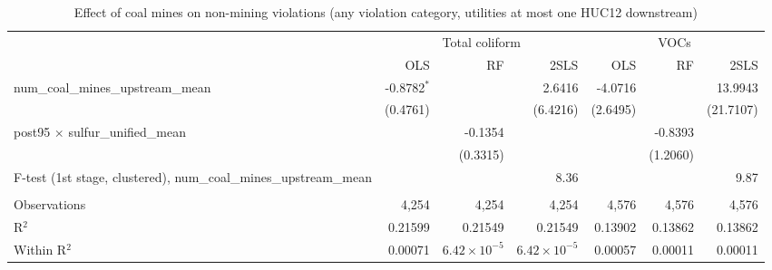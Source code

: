 
\begin{table}[htbp]
   
   \caption{\label{2sls_dwnstrm_nonminevio_allcat} Effect of coal mines on non-mining violations (any violation category, utilities at most one HUC12 downstream)}
   \bigskip
   
   \centering
   
   \begin{adjustbox}{width = \textwidth, center}
      
      
      \begin{tabular}{lrrrrrr}
         \toprule
         
          & \multicolumn{3}{c}{Total coliform} & \multicolumn{3}{c}{VOCs}\\
         
                                                                             & OLS           & RF                    & 2SLS                  & OLS      & RF       & 2SLS\\  
         
         \midrule 
         num\_coal\_mines\_upstream\_mean                                    & -0.8782$^{*}$ &                       & 2.6416                & -4.0716  &          & 13.9943\\   
                                                                             & (0.4761)      &                       & (6.4216)              & (2.6495) &          & (21.7107)\\   
         post95 $\times$ sulfur\_unified\_mean                               &               & -0.1354               &                       &          & -0.8393  &   \\   
                                                                             &               & (0.3315)              &                       &          & (1.2060) &   \\   
         
         F-test (1st stage, clustered), num\_coal\_mines\_upstream\_mean     &               &                       & 8.36                  &          &          & 9.87\\  
         
          \\
         
         Observations                                                        & 4,254         & 4,254                 & 4,254                 & 4,576    & 4,576    & 4,576\\  
         R$^2$                                                               & 0.21599       & 0.21549               & 0.21549               & 0.13902  & 0.13862  & 0.13862\\  
         Within R$^2$                                                        & 0.00071       & $6.42\times 10^{-5}$  & $6.42\times 10^{-5}$  & 0.00057  & 0.00011  & 0.00011\\  
         

\end{tabular}
\end{adjustbox}
\end{table}
